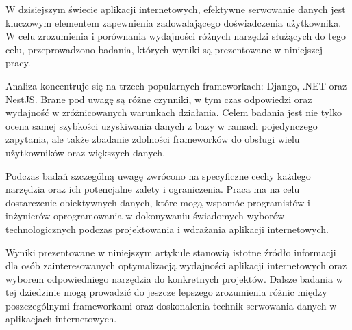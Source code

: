 W dzisiejszym świecie aplikacji internetowych, efektywne serwowanie danych jest kluczowym elementem zapewnienia zadowalającego doświadczenia użytkownika.
W celu zrozumienia i porównania wydajności różnych narzędzi służących do tego celu, przeprowadzono badania, których wyniki są prezentowane w niniejszej pracy.

Analiza koncentruje się na trzech popularnych frameworkach: Django, .NET oraz NestJS.
Brane pod uwagę są różne czynniki, w tym czas odpowiedzi oraz wydajność w zróżnicowanych warunkach działania.
Celem badania jest nie tylko ocena samej szybkości uzyskiwania danych z bazy w ramach pojedynczego zapytania, ale także zbadanie zdolności frameworków do obsługi wielu użytkowników oraz większych danych.

Podczas badań szczególną uwagę zwrócono na specyficzne cechy każdego narzędzia oraz ich potencjalne zalety i ograniczenia. Praca ma na celu dostarczenie obiektywnych danych, które mogą wspomóc programistów i inżynierów oprogramowania w dokonywaniu świadomych wyborów technologicznych podczas projektowania i wdrażania aplikacji internetowych.

Wyniki prezentowane w niniejszym artykule stanowią istotne źródło informacji dla osób zainteresowanych optymalizacją wydajności aplikacji internetowych oraz wyborem odpowiedniego narzędzia do konkretnych projektów.
Dalsze badania w tej dziedzinie mogą prowadzić do jeszcze lepszego zrozumienia różnic między poszczególnymi frameworkami oraz doskonalenia technik serwowania danych w aplikacjach internetowych.